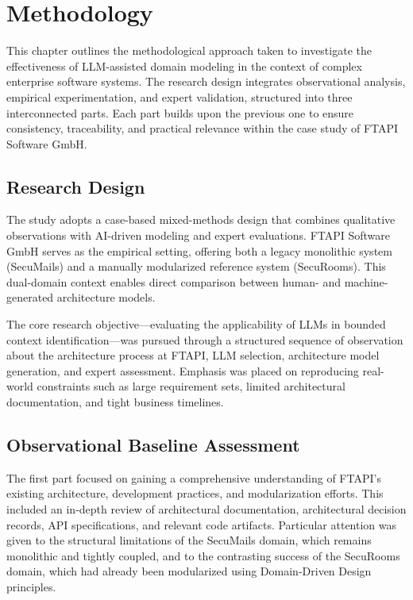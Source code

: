 \chapter{Methodology}\label{chapter:method}

This chapter outlines the methodological approach taken to investigate the effectiveness of LLM-assisted domain modeling in the context of complex enterprise software systems. The research design integrates observational analysis, empirical experimentation, and expert validation, structured into three interconnected parts. Each part builds upon the previous one to ensure consistency, traceability, and practical relevance within the case study of FTAPI Software GmbH.

\section{Research Design}

The study adopts a case-based mixed-methods design that combines qualitative observations with AI-driven modeling and expert evaluations. FTAPI Software GmbH serves as the empirical setting, offering both a legacy monolithic system (SecuMails) and a manually modularized reference system (SecuRooms). This dual-domain context enables direct comparison between human- and machine-generated architecture models.

The core research objective—evaluating the applicability of LLMs in bounded context identification—was pursued through a structured sequence of observation about the architecture process at FTAPI, LLM selection, architecture model generation, and expert assessment. Emphasis was placed on reproducing real-world constraints such as large requirement sets, limited architectural documentation, and tight business timelines.

\section{Observational Baseline Assessment}

The first part focused on gaining a comprehensive understanding of FTAPI's existing architecture, development practices, and modularization efforts. This included an in-depth review of architectural documentation, architectural decision records, API specifications, and relevant code artifacts. Particular attention was given to the structural limitations of the SecuMails domain, which remains monolithic and tightly coupled, and to the contrasting success of the SecuRooms domain, which had already been modularized using Domain-Driven Design principles.

